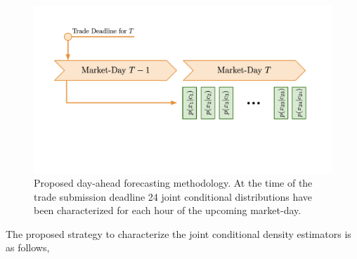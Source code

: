 \begin{figure}[htbp]
    \caption[Proposed forecasting methodology in relation to the day-ahead forecasting timeline]{
        Proposed day-ahead forecasting methodology.
        At the time of the trade submission deadline 24 joint conditional
        distributions have been characterized for each hour of the upcoming market-day.
    }
    \begin{center}
        \setlength{\fboxsep}{0pt}%
        \setlength{\fboxrule}{1pt}%
            \includegraphics[width=120mm]{figs/da_fc_task.pdf}
    \end{center}
    \label{fig:da_fc_task}
\end{figure}

The proposed strategy to characterize the joint conditional density estimators is as follows,

